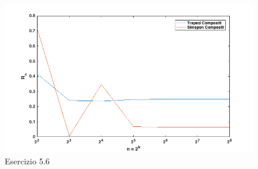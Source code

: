 \begin{figure}[h]
\caption{Esercizio 5.6}
\label{QuadrRapp}
\includegraphics[width=\textwidth]{plot/rapp_err}
\end{figure}